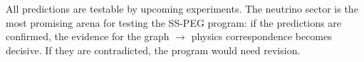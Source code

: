 All predictions are testable by upcoming experiments. The neutrino sector is the most promising arena for testing the SS-PEG program: if the predictions are confirmed, the evidence for the graph $\to$ physics correspondence becomes decisive. If they are contradicted, the program would need revision.
